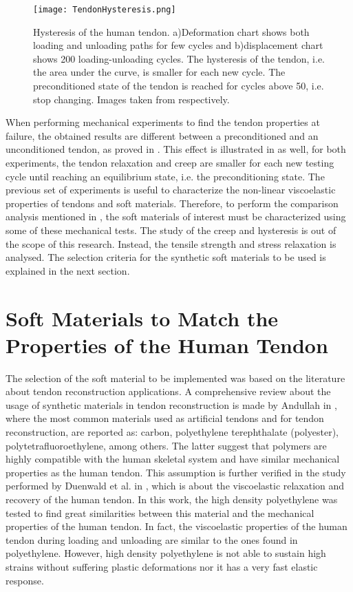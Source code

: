 \begin{figure}[htb!]
    \centering
    \texttt{[image: TendonHysteresis.png]}
    \caption{Hysteresis of the human tendon. a)Deformation chart shows both loading and unloading paths for few cycles and b)displacement chart shows 200 loading-unloading cycles. The hysteresis of the tendon, i.e. the area under the curve, is smaller for each new cycle. The preconditioned state of the tendon is reached for cycles above 50, i.e. stop changing. Images taken from \cite{maurel1998biomechanical,schatzmann1998effect} respectively. }
    \label{fig:tendonHysteresis}
\end{figure}

When performing mechanical experiments to find the tendon properties at failure, the obtained results are different between a preconditioned and an unconditioned tendon, as proved in \cite{schatzmann1998effect}. This effect is illustrated in  as well, for both experiments, the tendon relaxation and creep are smaller for each new testing cycle until reaching an equilibrium state, i.e. the preconditioning state. The previous set of experiments is useful to characterize the non-linear viscoelastic properties of tendons and soft materials. Therefore, to perform the comparison analysis mentioned in , the soft materials of interest must be characterized using some of these mechanical tests. The study of the creep and hysteresis is out of the scope of this research. Instead, the tensile strength and stress relaxation is analysed. The selection criteria for the synthetic soft materials to be used is explained in the next section.

\section{Soft Materials to Match the Properties of the Human Tendon} \label{sec:softMaterials}

The selection of the soft material to be implemented was based on the literature about tendon reconstruction applications. A comprehensive review about the usage of synthetic materials in tendon reconstruction is made by Andullah in \cite{abdullah2015usage}, where the most common materials used as artificial tendons and for tendon reconstruction, are reported as: carbon, polyethylene terephthalate (polyester), polytetrafluoroethylene, among others. The latter suggest that polymers are highly compatible with the human skeletal system and have similar mechanical properties as the human tendon. This assumption is further verified in the study performed by Duenwald et al. in \cite{duenwald2009viscoelastic}, which is about the viscoelastic relaxation and recovery of the human tendon. In this work, the high density polyethylene was tested to find great similarities between this material and the mechanical properties of the human tendon. In fact, the viscoelastic properties of the human tendon during loading and unloading are similar to the ones found in polyethylene. However, high density polyethylene is not able to sustain high strains without suffering plastic deformations nor it has a very fast elastic response.

